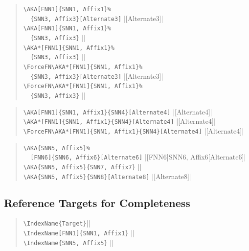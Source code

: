 \documentclass[oneside]{article}
\begin{document}
\begin{quote}
\Verb+\AKA[FNN1]{SNN1, Affix1}%+\\
\Verb+  {SNN3, Affix3}[Alternate3]+\dotfill
  |[Alternate3]|\\
\Verb+\AKA[FNN1]{SNN1, Affix1}%+\\
\Verb+  {SNN3, Affix3}+\dotfill
  ||\\
\Verb+\AKA*[FNN1]{SNN1, Affix1}%+\\
\Verb+  {SNN3, Affix3}+\dotfill
  ||\\
\Verb+\ForceFN\AKA*[FNN1]{SNN1, Affix1}%+\\
\Verb+  {SNN3, Affix3}[Alternate3]+\dotfill
  |\ForceFN{}[Alternate3]|\\
\Verb+\ForceFN\AKA*[FNN1]{SNN1, Affix1}%+\\
\Verb+  {SNN3, Affix3}+\dotfill
  |\ForceFN{}|
\end{quote}

\begin{quote}
\Verb+\AKA[FNN1]{SNN1, Affix1}{SNN4}[Alternate4]+\dotfill
  |[Alternate4]|\\
\Verb+\AKA*[FNN1]{SNN1, Affix1}{SNN4}[Alternate4]+\dotfill
  |[Alternate4]|\\
\Verb+\ForceFN\AKA*[FNN1]{SNN1, Affix1}{SNN4}[Alternate4]+\dotfill
  |\ForceFN{}[Alternate4]|
\end{quote}

\begin{quote}
\Verb+\AKA{SNN5, Affix5}%+\\
\Verb+  [FNN6]{SNN6, Affix6}[Alternate6]+\dotfill
  |[FNN6]{SNN6, Affix6}[Alternate6]|\\
\Verb+\AKA{SNN5, Affix5}{SNN7, Affix7}+\dotfill
  ||\\
\Verb+\AKA{SNN5, Affix5}{SNN8}[Alternate8]+\dotfill
  |[Alternate8]|\\
\end{quote}

\subsection{Reference Targets for Completeness}

\begin{quote}
\Verb+\IndexName{Target}+\dotfill||\\
\Verb+\IndexName[FNN1]{SNN1, Affix1}+\dotfill
  ||\\
\Verb+\IndexName{SNN5, Affix5}+\dotfill
  ||
\end{quote}

%
%

{}
\printindex[per]

\renewcommand\indexname{Index of Subjects}
{}
\printindex
\end{document}
